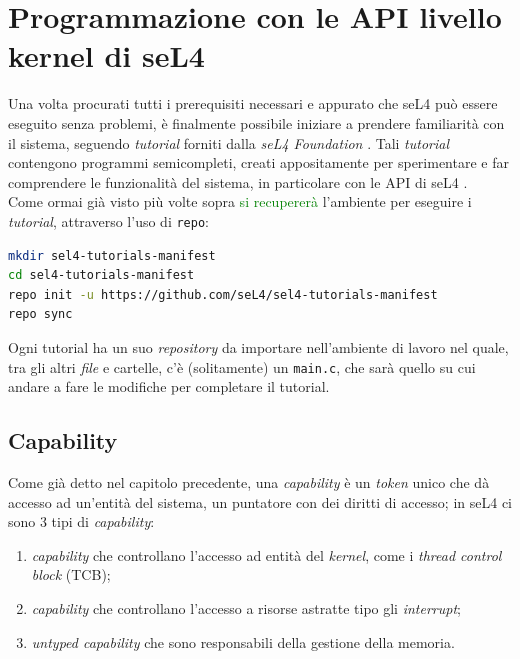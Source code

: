 \section{Programmazione con le API livello kernel di seL4}
Una volta procurati tutti i prerequisiti necessari e appurato che seL4 può essere eseguito senza problemi, è finalmente possibile iniziare a prendere familiarità con il sistema, seguendo \textit{tutorial} forniti dalla \textit{seL4 Foundation} \cite{seL4Tutorial}. Tali \textit{tutorial} contengono programmi semicompleti, creati appositamente per sperimentare e far comprendere le funzionalità del sistema, in particolare con le API di seL4 \cite{sel4API}.\\
Come ormai già visto più volte sopra \textcolor{green}{si recupererà} l'ambiente per eseguire i \textit{tutorial}, attraverso l'uso di \texttt{repo}:
\begin{lstlisting}[language=bash]
mkdir sel4-tutorials-manifest
cd sel4-tutorials-manifest
repo init -u https://github.com/seL4/sel4-tutorials-manifest
repo sync
\end{lstlisting}
Ogni tutorial ha un suo \textit{repository} da importare nell'ambiente di lavoro nel quale, tra gli altri \textit{file} e cartelle, c'è (solitamente) un \texttt{main.c}, che sarà quello su cui andare a fare le modifiche per completare il tutorial.

\subsection{Capability}
Come già detto nel capitolo precedente, una \textit{capability} è un \textit{token} unico che dà accesso ad un'entità del sistema, un puntatore con dei diritti di accesso; in seL4 ci sono 3 tipi di \textit{capability}:
\begin{enumerate}
	\item \textit{capability} che controllano l'accesso ad entità del \textit{kernel}, come i \textit{thread control block} (TCB);
	\item \textit{capability} che controllano l'accesso a risorse astratte tipo gli \textit{interrupt};
	\item \textit{untyped capability} che sono responsabili della gestione della memoria.
\end{enumerate}

